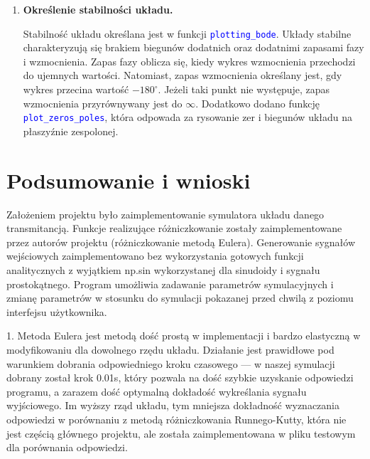 \documentclass[10pt, a4paper]{article}
\begin{document}
\begin{enumerate}[label=\alph*.]
  \item \textbf{Określenie stabilności układu.} \par\vspace{0.1cm}
  Stabilność układu określana jest w funkcji \textcolor{blue}{\texttt{plotting\_bode}}.
  Układy stabilne charakteryzują się brakiem biegunów dodatnich oraz dodatnimi zapasami fazy i wzmocnienia.
  Zapas fazy oblicza się, kiedy wykres wzmocnienia przechodzi do ujemnych wartości. Natomiast, zapas wzmocnienia określany jest, gdy wykres przecina wartość $-180^{\circ}$.
  Jeżeli taki punkt nie występuje, zapas wzmocnienia przyrównywany jest do $\infty$. Dodatkowo dodano funkcję \textcolor{blue}{\texttt{plot\_zeros\_poles}}, która odpowada za 
  rysowanie zer i biegunów układu na płaszyźnie zespolonej.
\end{enumerate}


\section{Podsumowanie i wnioski}

Założeniem projektu było zaimplementowanie symulatora układu danego transmitancją. Funkcje realizujące różniczkowanie zostały 
zaimplementowane przez autorów projektu (różniczkowanie metodą Eulera). Generowanie sygnałów wejściowych zaimplementowano bez wykorzystania
gotowych funkcji analitycznych z wyjątkiem np.sin wykorzystanej dla sinudoidy i sygnału prostokątnego. Program umożliwia zadawanie 
parametrów symulacyjnych i zmianę parametrów w stosunku do symulacji pokazanej przed chwilą z poziomu interfejsu użytkownika. 

\vspace{0.5cm}

1. Metoda Eulera jest metodą dość prostą w implementacji i bardzo elastyczną w modyfikowaniu dla dowolnego rzędu układu. 
Działanie jest prawidłowe pod warunkiem dobrania odpowiedniego kroku czasowego --- w naszej symulacji dobrany został krok 0.01s, który pozwala na dość
szybkie uzyskanie odpowiedzi programu, a zarazem dość optymalną dokładość wykreślania sygnału wyjściowego. Im wyższy rząd układu, tym mniejsza dokładność wyznaczania odpowiedzi
w porównaniu z metodą różniczkowania Runnego-Kutty, która nie jest częścią głównego projektu, ale została zaimplementowana w pliku testowym dla porównania odpowiedzi.
\end{document}
